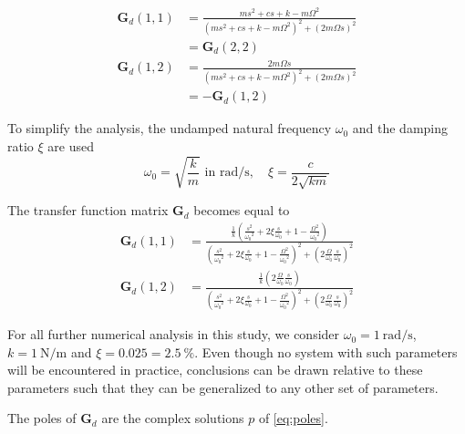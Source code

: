 \documentclass[10pt]{iopart}
\begin{document}
\begin{subequations}
\begin{align}
  \bm{G}_{d}(1,1) &= {\frac{ms^2 + cs + k - m \Omega^2}{\left( m s^2 + cs + k - m \Omega^2 \right)^2 + \left( 2 m \Omega s \right)^2}} \\
                  &= \bm{G}_{d}(2,2) \nonumber \\
  \bm{G}_{d}(1,2) &= {\frac{2 m \Omega s}{\left( m s^2 + cs + k - m \Omega^2 \right)^2 + \left( 2 m \Omega s \right)^2}} \\
                  &= -\bm{G}_{d}(1,2) \nonumber
\end{align}
\end{subequations}

To simplify the analysis, the undamped natural frequency \(\omega_0\) and the damping ratio \(\xi\) are used
\begin{equation}
  \omega_0 = \sqrt{\frac{k}{m}} \text{ in } \si{\radian\per\second}, \quad \xi = \frac{c}{2 \sqrt{k m}}
\end{equation}

The transfer function matrix \(\bm{G}_d\) becomes equal to
\begin{subequations}
\label{eq:Gd_w0_xi_k}
  \begin{align}
    \bm{G}_{d}(1,1) &= {\scriptstyle \frac{\frac{1}{k} \left( \frac{s^2}{{\omega_0}^2} + 2 \xi \frac{s}{\omega_0} + 1 - \frac{{\Omega}^2}{{\omega_0}^2} \right)}{\left( \frac{s^2}{{\omega_0}^2} + 2 \xi \frac{s}{\omega_0} + 1 - \frac{{\Omega}^2}{{\omega_0}^2} \right)^2 + \left( 2 \frac{\Omega}{\omega_0} \frac{s}{\omega_0} \right)^2} } \\
    \bm{G}_{d}(1,2) &= {\scriptstyle \frac{\frac{1}{k} \left( 2 \frac{\Omega}{\omega_0} \frac{s}{\omega_0} \right)}{\left( \frac{s^2}{{\omega_0}^2} + 2 \xi \frac{s}{\omega_0} + 1 - \frac{{\Omega}^2}{{\omega_0}^2} \right)^2 + \left( 2 \frac{\Omega}{\omega_0} \frac{s}{\omega_0} \right)^2} }
  \end{align}
\end{subequations}

For all further numerical analysis in this study, we consider \(\omega_0 = \SI{1}{\radian\per\second}\), \(k = \SI{1}{\newton\per\meter}\) and \(\xi = 0.025 = \SI{2.5}{\percent}\).
Even though no system with such parameters will be encountered in practice, conclusions can be drawn relative to these parameters such that they can be generalized to any other set of parameters.

\par
The poles of \(\bm{G}_d\) are the complex solutions \(p\) of \eqref{eq:poles}.
\end{document}
